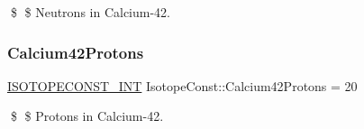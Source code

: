 \$ \$ Neutrons in Calcium-\/42. \mbox{\label{group___isotope_const-_calcium-_ca42_ga2791770353cb5c072a663d48b5778b6b}} 
\subsubsection{\texorpdfstring{Calcium42\+Protons}{Calcium42Protons}}
{\footnotesize\ttfamily \mbox{\hyperlink{group___isotope_const-_macros_ga5f18360b3e99483a35c32d789e62621c}{I\+S\+O\+T\+O\+P\+E\+C\+O\+N\+S\+T\+\_\+\+I\+NT}} Isotope\+Const\+::\+Calcium42\+Protons = 20}

\$ \$ Protons in Calcium-\/42. 